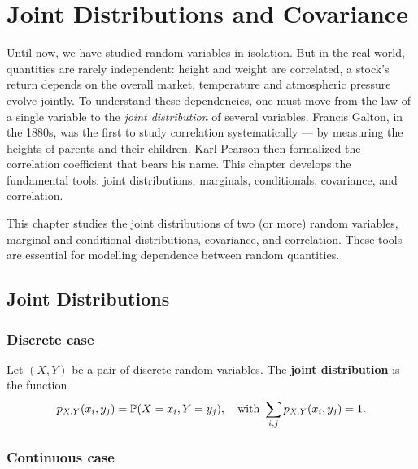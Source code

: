 \chapter{Joint Distributions and Covariance}
\label{ch:joint}

Until now, we have studied random variables in isolation. But in the real world, quantities are rarely independent: height and weight are correlated, a stock's return depends on the overall market, temperature and atmospheric pressure evolve jointly. To understand these dependencies, one must move from the law of a single variable to the \emph{joint distribution} of several variables. Francis Galton, in the 1880s, was the first to study correlation systematically --- by measuring the heights of parents and their children. Karl Pearson then formalized the correlation coefficient that bears his name. This chapter develops the fundamental tools: joint distributions, marginals, conditionals, covariance, and correlation.

\begin{intuition}
This chapter studies the joint distributions of two (or more) random variables,
marginal and conditional distributions, covariance, and correlation. These tools
are essential for modelling dependence between random quantities.
\end{intuition}

\section{Joint Distributions}

\subsection{Discrete case}

\begin{definition}
Let $(X, Y)$ be a pair of discrete random variables. The \textbf{joint distribution}
is the function
\[
    p_{X,Y}(x_i, y_j) = \mathbb{P}(X = x_i, Y = y_j), \quad
    \text{with } \sum_{i,j} p_{X,Y}(x_i, y_j) = 1.
\]
\end{definition}

\subsection{Continuous case}

